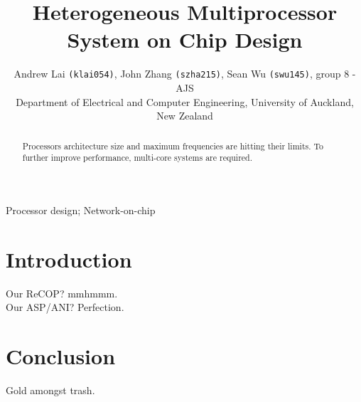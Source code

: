 \documentclass[journal]{IEEEtran}
\begin{document}
	
	\title{Heterogeneous Multiprocessor System on Chip Design}
	\author{Andrew Lai \texttt{(klai054)}, John Zhang \texttt{(szha215)}, Sean Wu \texttt{(swu145)}, group 8 - AJS \\Department of Electrical and Computer Engineering, University of Auckland, New Zealand}
	
	\maketitle
	
	\begin{abstract}
		Processors architecture size and maximum frequencies are hitting their limits. To further improve performance, multi-core systems are required.
	\end{abstract}
	
	\begin{IEEEkeywords}
		Processor design; Network-on-chip 
	\end{IEEEkeywords}
	
	
	\section{Introduction}
	Our ReCOP? mmhmmm. \\
	Our ASP/ANI? Perfection.
	
	
	\section{Conclusion}
	Gold amongst trash.
	
	
	
	
	
	
\end{document}
